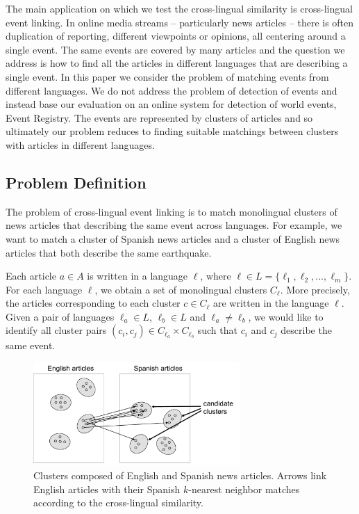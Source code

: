 \documentclass[twoside,11pt]{article}
\begin{document}
The main application on which we test the cross-lingual similarity is cross-lingual event linking. In online media streams -- particularly news articles -- there is often duplication of reporting, different viewpoints or opinions, all centering around a single event. The same events are covered by many articles and the question we address is how to find all the articles in different languages that are describing a single event. In this paper we consider the problem of matching events from different languages. We do not address the problem of detection of events and instead base our evaluation on an online system for detection of world events, Event Registry. The events are represented by clusters of articles and so ultimately our problem reduces to finding suitable matchings between clusters with articles in different languages.

\subsection{Problem Definition}

The problem of cross-lingual event linking is to match monolingual clusters of news articles that describing the same event across languages. For example, we want to match a cluster of Spanish news articles and a cluster of English news articles that both describe the same earthquake.

Each article $a \in A$ is written in a language $\ell$, where $\ell \in L = \{\ell_1,\ell_2,...,\ell_m\}$. For each language $\ell$, we obtain a set of monolingual clusters $C_{\ell}$. More precisely, the articles corresponding to each cluster $c \in C_{\ell}$ are written in the language $\ell$. Given a pair of languages $\ell_a \in L$, $\ell_b \in L$ and $\ell_a \not= \ell_b$, we would like to identify all cluster pairs $(c_i, c_j) \in C_{\ell_a} \times C_{\ell_b}$ such that $c_i$ and $c_j$ describe the same event.

\begin{figure}[tb]
\centering
\includegraphics[width=0.7\textwidth]{clusters.pdf}
\caption{\label{fig:clusters}  Clusters composed of English and Spanish news articles. Arrows link English articles with their Spanish $k$-nearest neighbor matches according to the cross-lingual similarity.}
\end{figure}
\end{document}
